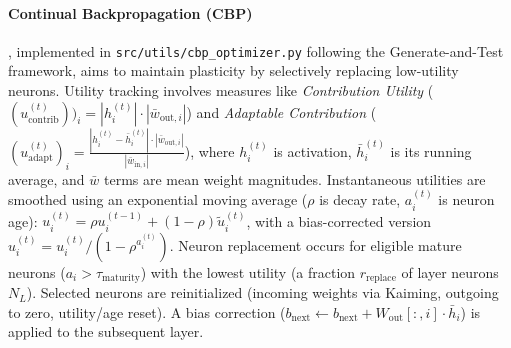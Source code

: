 \documentclass{article}
\numberwithin{figure}{section}
\begin{document}
\paragraph{Continual Backpropagation (CBP)}, implemented in \texttt{src/utils/cbp\_optimizer.py} following the Generate-and-Test framework, aims to maintain plasticity by selectively replacing low-utility neurons. Utility tracking involves measures like \emph{Contribution Utility} ($(u_{\text{contrib}}^{(t)}))_i = |h_i^{(t)}| \cdot |\bar{w}_{\text{out},i}|$) and \emph{Adaptable Contribution} ($(u_{\text{adapt}}^{(t)})_i = \frac{|h_i^{(t)} - \bar{h}_i^{(t)}| \cdot |\bar{w}_{\text{out},i}|}{|\bar{w}_{\text{in},i}|}$), where $h_i^{(t)}$ is activation, $\bar{h}_i^{(t)}$ is its running average, and $\bar{w}$ terms are mean weight magnitudes. Instantaneous utilities are smoothed using an exponential moving average ($\rho$ is decay rate, $a_i^{(t)}$ is neuron age): $u_i^{(t)} = \rho u_i^{(t-1)} + (1-\rho) \tilde{u}_i^{(t)}$, with a bias-corrected version $\hat{u}_i^{(t)} = u_i^{(t)}/(1 - \rho^{a_i^{(t)}})$. Neuron replacement occurs for eligible mature neurons ($a_i > \tau_{\text{maturity}}$) with the lowest utility (a fraction $r_{\text{replace}}$ of layer neurons $N_L$). Selected neurons are reinitialized (incoming weights via Kaiming, outgoing to zero, utility/age reset). A bias correction ($b_{\text{next}} \leftarrow b_{\text{next}} + W_{\text{out}}[:, i] \cdot \bar{h}_i$) is applied to the subsequent layer.


\end{document}
